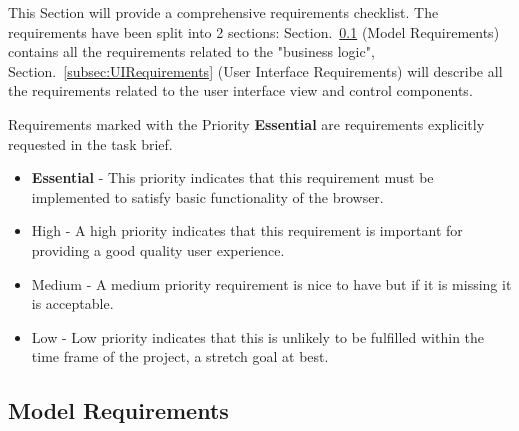 \documentclass[../Main.tex]{subfiles}
\begin{document}
This Section will provide a comprehensive requirements checklist. 
The requirements have been split into 2 sections: Section.~\ref{subsec:ModelRequirements} (Model Requirements) contains all the requirements related to the "business logic", Section.~\ref{subsec:UIRequirements} (User Interface Requirements) will describe all the requirements related to the user interface view and control components.

Requirements marked with the Priority \textbf{Essential} are requirements explicitly requested in the task brief.\\
\linebreak
{}

\begin{itemize}
    \item \textbf{Essential} - This priority indicates that this requirement must be implemented to satisfy basic functionality of the browser.
    \item High - A high priority indicates that this requirement is important for providing a good quality user experience.
    \item Medium - A medium priority requirement is nice to have but if it is missing it is acceptable.
    \item Low - Low priority indicates that this is unlikely to be fulfilled within the time frame of the project, a stretch goal at best.
\end{itemize}
\pagebreak
\subsection{Model Requirements}\label{subsec:ModelRequirements}
\end{document}

